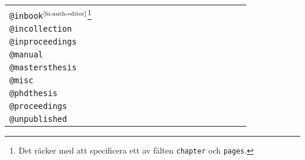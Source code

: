 \documentclass[lang=sv,ptsize=10pt,font=none,nomath,titles=bf,../../a4.tex]{subfiles}
\begin{document}
\begin{table}[bp]
\begin{minipage}{0.98\textwidth}
\begin{tabular}{lc@{}c@{}c@{}c@{}c@{}c@{}c@{}c@{}%
						 c@{}c@{}c@{}c@{}c@{}c@{}c@{}c}
		\texttt{@inbook}$^\text{\ref{fn:auth-editor}}$\footnote{\label{fn:chap-pages}Det räcker med att specificera ett av fälten \texttt{chapter} och \texttt{pages}.} & \optional & \required & \unavailable & \required & \optional & \required & \unavailable & \optional & \unavailable & \required & \required & \unavailable & \optional & \required & \optional & \required \\
		\texttt{@incollection} & \optional & \required & \required & \unavailable & \unavailable & \optional & \unavailable & \optional & \unavailable & \optional & \optional & \unavailable & \unavailable & \required & \unavailable & \required \\
		\texttt{@inproceedings} & \optional & \required & \required & \unavailable & \unavailable & \optional & \unavailable & \optional & \unavailable & \optional & \optional & \unavailable & \unavailable & \required & \unavailable & \required \\
		\texttt{@manual} & \unavailable & \optional & \unavailable & \unavailable & \optional & \unavailable & \unavailable & \optional & \unavailable & \unavailable & \unavailable & \unavailable & \unavailable & \required & \unavailable & \optional \\
		\texttt{@mastersthesis} & \optional & \required & \unavailable & \unavailable & \unavailable & \unavailable & \unavailable & \optional & \unavailable & \unavailable & \unavailable & \required & \unavailable & \required & \unavailable & \required \\
		\texttt{@misc} & \unavailable & \optional & \unavailable & \unavailable & \unavailable & \unavailable & \unavailable & \optional & \unavailable & \unavailable & \unavailable & \unavailable & \unavailable & \optional & \unavailable & \optional \\
		\texttt{@phdthesis} & \optional & \required & \unavailable & \unavailable & \unavailable & \unavailable & \unavailable & \optional & \unavailable & \unavailable & \unavailable & \required & \unavailable & \required & \unavailable & \required \\
		\texttt{@proceedings} & \optional & \unavailable & \unavailable & \unavailable & \unavailable & \optional & \unavailable & \optional & \unavailable & \unavailable & \optional & \unavailable & \unavailable & \required & \unavailable & \required \\
		\texttt{@unpublished} & \unavailable & \required & \unavailable & \unavailable & \unavailable & \unavailable & \unavailable & \optional & \unavailable & \unavailable & \unavailable & \unavailable & \unavailable & \required & \unavailable & \optional \\
		\bottomrule 
		\end{tabular}
	\end{minipage}
\end{table}
\end{document}

